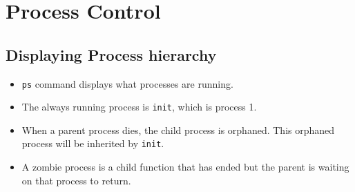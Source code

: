 \documentclass[]{article}
\begin{document}
\section{Process Control}
\subsection{Displaying Process hierarchy}
\begin{itemize}
\item \texttt{ps} command displays what processes are running.
\item The always running process is \texttt{init}, which is process 1.
\item When a parent process dies, the child process is orphaned. This orphaned
process will be inherited by \texttt{init}.
\item A zombie process is a child function that has ended but the parent is
waiting on that process to return.
\end{itemize}
\end{document}
